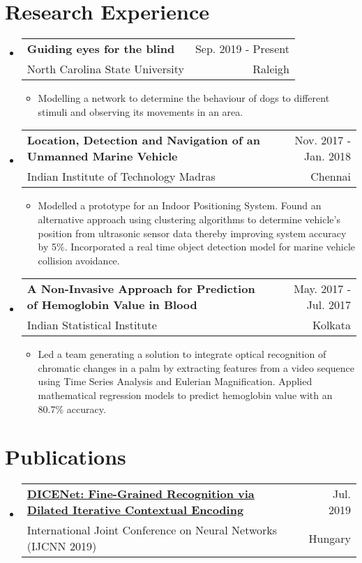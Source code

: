 \documentclass[11pt,letter]{article}
\makeatletter
\newcommand{\resItem}[1]{ \vspace{-1pt}
  \item\small{
     
  } \vspace{-1pt}
}
\newcommand{\resumeSubheading}[4]{
  \vspace{-4pt}\item
    \begin{tabular*}{0.97\textwidth}{l@{\extracolsep{\fill}}r}
      \textbf{#1} & {\small #2} \\
      {\small#3} & {\small #4} \\
    \end{tabular*}\vspace{-6pt}
}
\newcommand{\resumeSubHeadingListStart}{\begin{itemize}[leftmargin=*]}
\newcommand{\resumeSubHeadingListEnd}{\end{itemize}}
\newcommand{\resumeItemListStart}{\begin{itemize}}
\newcommand{\resumeItemListEnd}{\end{itemize}\vspace{-5pt}}
\makeatother
\begin{document}
\section{Research Experience}
  \resumeSubHeadingListStart
    \resumeSubheading
      {Guiding eyes for the blind}{Sep. 2019 - Present}
      {North Carolina State University}{Raleigh}
      \resumeItemListStart
        \resItem{Optimization}
          {Modelling a network to determine the behaviour of dogs to different stimuli and observing its movements in an area.}
      \resumeItemListEnd
      
    \resumeSubheading
      {Location, Detection and Navigation of an Unmanned Marine Vehicle}{Nov. 2017 - Jan. 2018}
      {Indian Institute of Technology Madras}{Chennai}
      \resumeItemListStart
        \resItem{Optimization}
          {Modelled a prototype for an Indoor Positioning System. Found an alternative approach using clustering algorithms to determine vehicle’s position from ultrasonic sensor data thereby improving system accuracy by 5\%. Incorporated a real time object detection model for marine vehicle collision avoidance.}
      \resumeItemListEnd

    \resumeSubheading
      {A Non-Invasive Approach for Prediction of Hemoglobin Value in Blood}{May. 2017 - Jul. 2017}
      {Indian Statistical Institute}{Kolkata}
      \resumeItemListStart
        \resItem{Machine Learning}
          {Led a team generating a solution to integrate optical recognition of chromatic changes in a palm by extracting features from a video sequence using Time Series Analysis and Eulerian Magnification. Applied mathematical regression models to predict hemoglobin value with an 80.7\% accuracy.}
      \resumeItemListEnd
      
  \resumeSubHeadingListEnd

\section{Publications}
    \resumeSubHeadingListStart
    \resumeSubheading
      {\href{https://ieeexplore.ieee.org/document/8851800}{DICENet: Fine-Grained Recognition via Dilated Iterative Contextual Encoding}}{Jul. 2019}
      {International Joint Conference on Neural Networks (IJCNN 2019)}{Hungary}
    \resumeSubHeadingListEnd

\end{document}
